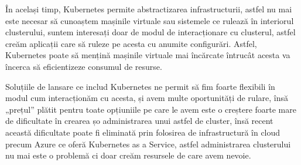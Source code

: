 În același timp, Kubernetes permite abstractizarea infrastructurii, astfel nu mai este 
necesar să cunoaștem mașinile virtuale sau sistemele ce rulează în interiorul clusterului,
suntem interesați doar de modul de interacționare cu clusterul, astfel creăm aplicații
care să ruleze pe acesta cu anumite configurări. Astfel, Kubernetes poate să mențină
mașinile virtuale mai încărcate întrucât acesta va încerca să eficientizeze consumul de resurse.

Soluțiile de lansare ce includ Kubernetes ne permit să fim foarte flexibili în modul
cum interacționăm cu acesta, și avem multe oportunități de rulare, însă „prețul”
plătit pentru toate opțiuniile pe care le avem este o creștere foarte mare 
de dificultate în crearea șo administrarea unui astfel de cluster, însă 
recent această dificultate poate fi eliminată prin folosirea de infrastructură 
în cloud precum Azure ce oferă Kubernetes as a Service, astfel administrarea clusterului
nu mai este o problemă ci doar creăm resursele de care avem nevoie.
